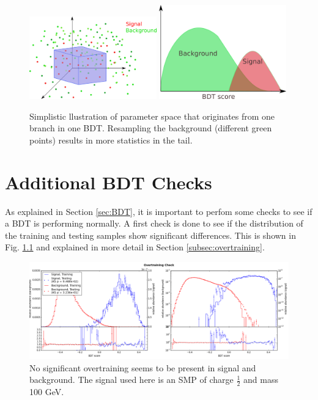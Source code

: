 \begin{appendices}
\begin{figure}
\centering
\includegraphics[width=0.49\textwidth]{appendix/img/resampling_after.png}
\includegraphics[width=0.49\textwidth]{appendix/img/hist2.png}
\caption{Simplistic llustration of parameter space that originates from one branch in one BDT. Resampling the background (different green points) results in more statistics in the tail.}
\label{fig:pvillustration2}
\end{figure}


\chapter{Additional BDT Checks}
\label{ch:bdtchecks}
As explained in Section \ref{sec:BDT}, it is important to perfom some checks to see if a BDT is performing normally. A first check is done to see if the distribution of the training and testing samples show significant differences. This is shown in Fig. \ref{fig:overtraining} and explained in more detail in Section \ref{subsec:overtraining}.\\

\begin{figure}[ht]
\centering
\includegraphics[width=\textwidth]{appendix/img/overtrain.png}
\caption{No significant overtraining seems to be present in signal and background. The signal used here is an SMP of charge $\frac{1}{2}$ and mass 100 GeV.}
\label{fig:overtraining}
\end{figure}


\end{appendices}
